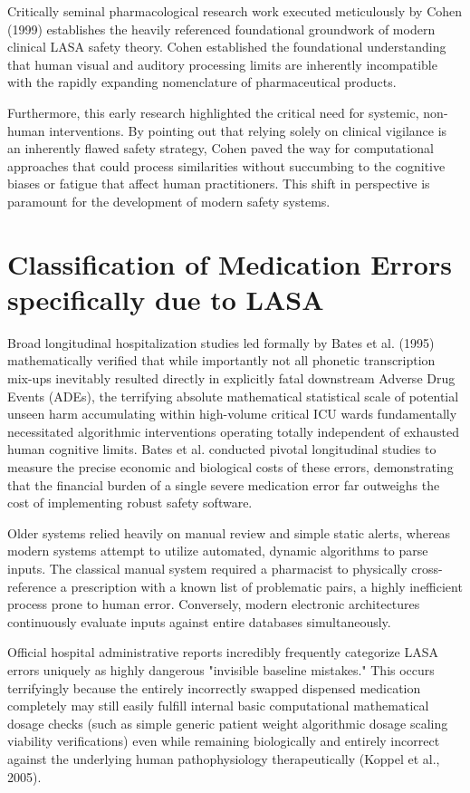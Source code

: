 \documentclass[12pt,a4paper]{report}
\begin{document}
Critically seminal pharmacological research work executed meticulously by Cohen (1999) establishes the heavily referenced foundational groundwork of modern clinical LASA safety theory. Cohen established the foundational understanding that human visual and auditory processing limits are inherently incompatible with the rapidly expanding nomenclature of pharmaceutical products. 

Furthermore, this early research highlighted the critical need for systemic, non-human interventions. By pointing out that relying solely on clinical vigilance is an inherently flawed safety strategy, Cohen paved the way for computational approaches that could process similarities without succumbing to the cognitive biases or fatigue that affect human practitioners. This shift in perspective is paramount for the development of modern safety systems.

\section{Classification of Medication Errors specifically due to LASA}
Broad longitudinal hospitalization studies led formally by Bates et al. (1995) mathematically verified that while importantly not all phonetic transcription mix-ups inevitably resulted directly in explicitly fatal downstream Adverse Drug Events (ADEs), the terrifying absolute mathematical statistical scale of potential unseen harm accumulating within high-volume critical ICU wards fundamentally necessitated algorithmic interventions operating totally independent of exhausted human cognitive limits. Bates et al. conducted pivotal longitudinal studies to measure the precise economic and biological costs of these errors, demonstrating that the financial burden of a single severe medication error far outweighs the cost of implementing robust safety software.

Older systems relied heavily on manual review and simple static alerts, whereas modern systems attempt to utilize automated, dynamic algorithms to parse inputs. The classical manual system required a pharmacist to physically cross-reference a prescription with a known list of problematic pairs, a highly inefficient process prone to human error. Conversely, modern electronic architectures continuously evaluate inputs against entire databases simultaneously.

Official hospital administrative reports incredibly frequently categorize LASA errors uniquely as highly dangerous "invisible baseline mistakes." This occurs terrifyingly because the entirely incorrectly swapped dispensed medication completely may still easily fulfill internal basic computational mathematical dosage checks (such as simple generic patient weight algorithmic dosage scaling viability verifications) even while remaining biologically and entirely incorrect against the underlying human pathophysiology therapeutically (Koppel et al., 2005).
\end{document}

